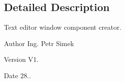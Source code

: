\subsection{Detailed Description}
Text editor window component creator. 

\begin{DoxyAuthor}{Author}
Ing. Petr Simek 
\end{DoxyAuthor}
\begin{DoxyVersion}{Version}
V1. 
\end{DoxyVersion}
\begin{DoxyDate}{Date}
28.. 
\end{DoxyDate}
